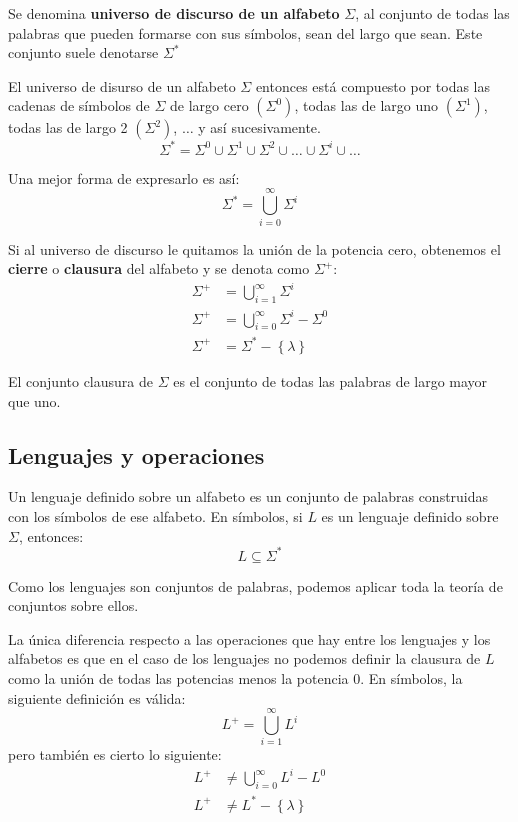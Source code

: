 \documentclass[12pt]{article}
\begin{document}
Se denomina \textbf{universo de discurso de un alfabeto} $ \Sigma $, al conjunto de todas las palabras que pueden formarse con sus símbolos, sean del largo que sean. Este conjunto suele denotarse $ \Sigma^{*} $

El universo de disurso de un alfabeto $ \Sigma $ entonces está compuesto por todas las cadenas de símbolos de $ \Sigma $ de largo cero $ \left(\Sigma^{0}\right) $, todas las de largo uno $ \left(\Sigma^{1}\right) $, todas las de largo 2 $ \left(\Sigma^{2}\right) $, $ \dots $ y así sucesivamente.
\[
	\Sigma^{*} = \Sigma^{0}\cup \Sigma^{1}\cup \Sigma^{2}\cup \dots \cup \Sigma^{i}\cup \dots
\]

Una mejor forma de expresarlo es así:
\[
	\Sigma^{*} = \bigcup_{i=0}^{\infty} \Sigma^{i}
\]

Si al universo de discurso le quitamos la unión de la potencia cero, obtenemos el \textbf{cierre} o \textbf{clausura} del alfabeto y se denota como $ \Sigma^{+} $:
\begin{align*}
	\Sigma^{+} & = \bigcup_{i=1}^{\infty} \Sigma^{i}              \\
	\Sigma^{+} & = \bigcup_{i=0}^{\infty} \Sigma^{i} - \Sigma^{0} \\
	\Sigma^{+} & = \Sigma^{*} - \left\{\lambda\right\}
\end{align*}

El conjunto clausura de $ \Sigma $ es el conjunto de todas las palabras de largo mayor que uno.

\subsection{Lenguajes y operaciones}
Un lenguaje definido sobre un alfabeto es un conjunto de palabras construidas con los símbolos de ese alfabeto. En símbolos, si $ L $ es un lenguaje definido sobre $ \Sigma $, entonces:
\[
	L \subseteq \Sigma^{*}
\]

Como los lenguajes son conjuntos de palabras, podemos aplicar toda la teoría de conjuntos sobre ellos.

La única diferencia respecto a las operaciones que hay entre los lenguajes y los alfabetos es que en el caso de los lenguajes no podemos definir la clausura de $ L $ como la unión de todas las potencias menos la potencia 0. En símbolos, la siguiente definición es válida:
\[
	L^{+} = \bigcup_{i=1}^{\infty} L^{i}
\]
pero también es cierto lo siguiente:
\begin{align*}
	L^{+} & \neq \bigcup_{i=0}^{\infty} L^{i} - L^{0} \\
	L^{+} & \neq L^{*} - \left\{\lambda\right\}
\end{align*}
\end{document}
